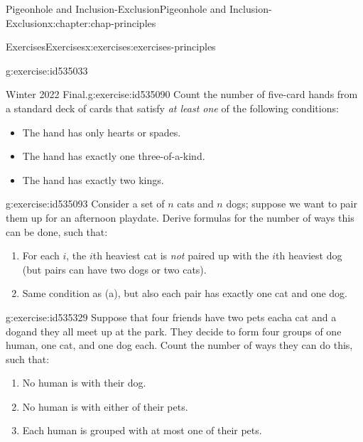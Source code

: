 \documentclass[oneside,10pt,]{book}
\numberwithin{equation}{section}
\begin{document}
\begin{chapterptx}{Pigeonhole and Inclusion-Exclusion}{}{Pigeonhole and Inclusion-Exclusion}{}{}{x:chapter:chap-principles}
\begin{exercises-section}{Exercises}{}{Exercises}{}{}{x:exercises:exercises-principles}
\begin{divisionexercise}{17}{}{}{g:exercise:id535033}
\begin{sidebyside}{1}{0.3}{0.3}{0}
\begin{sbspanel}{0.4}
{
}%
\end{sbspanel}%
\end{sidebyside}%
\end{divisionexercise}%
\begin{divisionexercise}{18}{Winter 2022 Final.}{}{g:exercise:id535090}%
Count the number of five-card hands from a standard deck of cards that satisfy \emph{at least one} of the following conditions:%
\begin{itemize}[label=\textbullet]
\item{}The hand has only hearts or spades.%
\item{}The hand has exactly one three-of-a-kind.%
\item{}The hand has exactly two kings.%
\end{itemize}
%
\end{divisionexercise}%
\begin{divisionexercise}{19}{}{}{g:exercise:id535093}%
Consider a set of \(n\) cats and \(n\) dogs; suppose we want to pair them up for an afternoon playdate. Derive formulas for the number of ways this can be done, such that:%
\begin{enumerate}[label=(\alph*)]
\item{}For each \(i\), the \(i\)th heaviest cat is \emph{not} paired up with the \(i\)th heaviest dog (but pairs can have two dogs or two cats).%
\item{}Same condition as (a), but also each pair has exactly one cat and one dog.%
\end{enumerate}
%
\end{divisionexercise}%
\begin{divisionexercise}{20}{}{}{g:exercise:id535329}%
Suppose that four friends have two pets each\textemdash{}a cat and a dog\textemdash{}and they all meet up at the park. They decide to form four groups of one human, one cat, and one dog each. Count the number of ways they can do this, such that:%
\begin{enumerate}[label=(\alph*)]
\item{}No human is with their dog.%
\item{}No human is with either of their pets.%
\item{}Each human is grouped with at most one of their pets.%
\end{enumerate}
%
\end{divisionexercise}%
\end{exercises-section}
\end{chapterptx}
\end{document}
